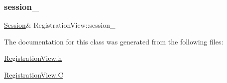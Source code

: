 \subsubsection{\texorpdfstring{session\+\_\+}{session\_}}
{\footnotesize\ttfamily \hyperlink{class_session}{Session}\& Registration\+View\+::session\+\_\+\hspace{0.3cm}{\ttfamily [private]}}



The documentation for this class was generated from the following files\+:\begin{DoxyCompactItemize}
\item 
\hyperlink{_registration_view_8h}{Registration\+View.\+h}\item 
\hyperlink{_registration_view_8_c}{Registration\+View.\+C}\end{DoxyCompactItemize}
